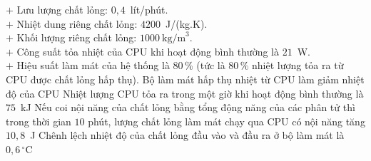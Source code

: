 \begin{ex}
		\hspace*{1.5em}$+$ Lưu lượng chất lỏng: $0{,}4$~lít/phút.\\
		\hspace*{1.5em}$+$ Nhiệt dung riêng chất lỏng: $4200$~J/(kg.K).\\
		\hspace*{1.5em}$+$ Khối lượng riêng chất lỏng: $1000~\text{kg/m}^3$.\\
		\hspace*{1.5em}$+$ Công suất tỏa nhiệt của CPU khi hoạt động bình thường là $21$~W.\\
		\hspace*{1.5em}$+$ Hiệu suất làm mát của hệ thống là $80\,\%$ (tức là $80\,\%$ nhiệt lượng tỏa ra từ CPU được chất lỏng hấp thụ).
		\choiceTFt
		{\True Bộ làm mát hấp thụ nhiệt từ CPU làm giảm nhiệt độ của CPU}
		{Nhiệt lượng CPU tỏa ra trong một giờ khi hoạt động bình thường là $75$~kJ}
		{Nếu coi nội năng của chất lỏng bằng tổng động năng của các phân tử thì trong thời gian $10$ phút, lượng chất lỏng làm mát chạy qua CPU có nội năng tăng $10{,}8$~J}
		{\True Chênh lệch nhiệt độ của chất lỏng đầu vào và đầu ra ở bộ làm mát là $0{,}6\,^\circ\text{C}$}
	\end{ex}

